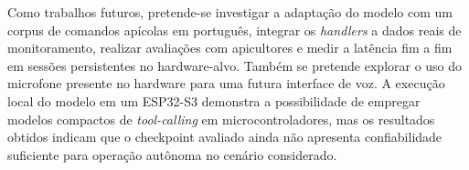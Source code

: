 \documentclass[12pt]{article}
\begin{document}
Como trabalhos futuros, pretende-se investigar a adaptação do modelo com um corpus de comandos apícolas em português, integrar os \textit{handlers} a dados reais de monitoramento, realizar avaliações com apicultores e medir a latência fim a fim em sessões persistentes no hardware-alvo. Também se pretende explorar o uso do microfone presente no hardware para uma futura interface de voz. A execução local do modelo em um ESP32-S3 demonstra a possibilidade de empregar modelos compactos de \textit{tool-calling} em microcontroladores, mas os resultados obtidos indicam que o checkpoint avaliado ainda não apresenta confiabilidade suficiente para operação autônoma no cenário considerado.





\end{document}
